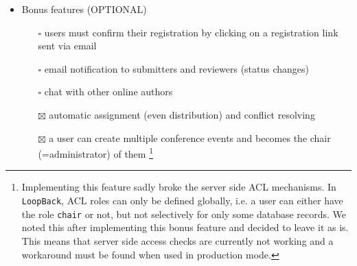 \documentclass[nochapterpage,nopartpage,noheadingspace,numbersubsubsec,bigchapter,colorback,accentcolor=tud9c,10pt]{tudreport}
\begin{document}
\begin{itemize}
            \item Bonus features (OPTIONAL)
            \begin{itemize}
                \item[$\square$] users must confirm their registration by clicking on a registration link sent via email
                \item[$\square$] email notification to submitters and reviewers (status changes)
                \item[$\square$] chat with other online authors
                \item[$\boxtimes$] automatic assignment (even distribution) and conflict resolving
                \item[$\boxtimes$] a user can create multiple conference events and becomes the chair (=administrator) of them%
                \footnote{Implementing this feature sadly broke the server side ACL mechanisms. In \texttt{LoopBack}, ACL roles can only be defined globally, i.e. a user can either have the role \texttt{chair} or not, but not selectively for only some database records. We noted this after implementing this bonus feature and decided to leave it as is. This means that server side access checks are currently not working and a workaround must be found when used in production mode.}
            \end{itemize}
        \end{itemize}
\end{document}
